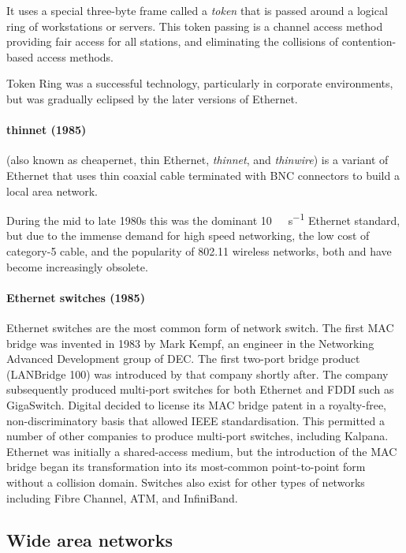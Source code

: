 {It uses a special three-byte frame called a \emph{token} that is passed around a logical ring of workstations or servers.
This token passing is a channel access method providing fair access for all stations, and eliminating the collisions of contention-based access methods.

Token Ring was a successful technology, particularly in corporate environments, but was gradually eclipsed by the later versions of Ethernet.

\paragraph{thinnet (1985)}
 (also known as cheapernet, thin Ethernet, \emph{thinnet}, and \emph{thinwire}) is a variant of Ethernet that uses thin coaxial cable terminated with \acs{BNC} connectors to build a local area network.

During the mid to late 1980s this was the dominant \SI{10}{\mega\bit\per\second} Ethernet standard, but due to the immense demand for high speed networking, the low cost of \mbox{category-5} cable, and the popularity of 802.11 wireless networks, both  and  have become increasingly obsolete.

\paragraph{Ethernet switches (1985)}
Ethernet switches are the most common form of network switch.
The first \acs{MAC} bridge was invented in 1983 by Mark Kempf, an engineer in the Networking Advanced Development group of \gls{DEC}.
The first two-port bridge product (LANBridge 100) was introduced by that company shortly after.
The company subsequently produced multi-port switches for both Ethernet and \acs{FDDI} such as GigaSwitch.
Digital decided to license its \acs{MAC} bridge patent in a royalty-free, non-dis\-crim\-i\-na\-tory basis that allowed \acs{IEEE} standardisation.
This permitted a number of other companies to produce multi-port switches, including Kalpana.
Ethernet was initially a shared-access medium, but the introduction of the \acs{MAC} bridge began its transformation into its most-common point-to-point form without a collision domain.
Switches also exist for other types of networks including Fibre Channel, \gls{ATM}, and InfiniBand.
    
\subsection{Wide area networks}
\label{sec:network-evoluation-wan}

}
